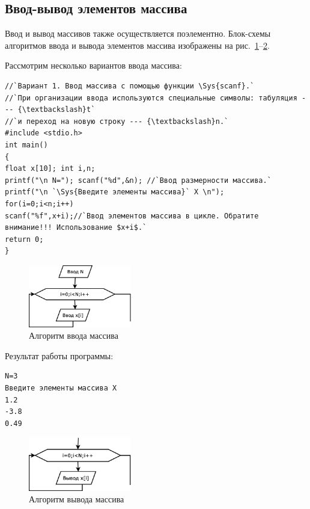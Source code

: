 \subsection[Ввод-вывод элементов массива]{Ввод-вывод элементов массива}
Ввод и вывод массивов также осуществляется поэлементно. Блок-схемы алгоритмов ввода и вывода элементов массива
 изображены на рис.~\ref{ch05:refDrawing1}--\ref{ch05:refDrawing2}.

Рассмотрим несколько вариантов ввода массива:
\begin{lstlisting}
//`Вариант 1. Ввод массива с помощью функции \Sys{scanf}.`
//`При организации ввода используются специальные символы: табуляция --- {\textbackslash}t` 
//`и переход на новую строку --- {\textbackslash}n.`
#include <stdio.h>
int main()
{
float x[10]; int i,n; 
printf("\n N="); scanf("%d",&n); //`Ввод размерности массива.`
printf("\n `\Sys{Введите элементы массива}` X \n"); 
for(i=0;i<n;i++)
scanf("%f",x+i);//`Ввод элементов массива в цикле. Обратите внимание!!! Использование $x+i$.`
return 0;
}
\end{lstlisting}

\begin{figure}[htb]
\begin{center}
\includegraphics[width=0.4\textwidth]{img/ris_5_2}
\caption{Алгоритм ввода массива }
\label{ch05:refDrawing1}
\end{center}
\end{figure}

Результат работы программы:
\begin{verbatim}
N=3
Введите элементы массива X 
1.2
-3.8
0.49
\end{verbatim}
\begin{figure}[htb]
\begin{center}
\includegraphics[width=0.4\textwidth]{img/ris_5_3}
\caption{Алгоритм вывода массива }
\label{ch05:refDrawing2}
\end{center}
\end{figure}

